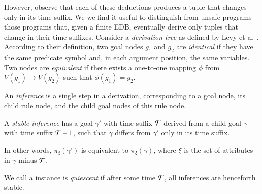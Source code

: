 However, observe that each of these deductions produces a tuple that changes
only in its time suffix.  We we find it useful to distinguish from unsafe
programs those programs that, given a finite EDB, eventually derive only tuples
that change in their time suffixes.  
Consider a \emph{derivation tree} as defined by Levy et al~\cite{levy}.  
According to their definition,
two goal nodes $g_1$ and $g_2$ are \emph{identical} if they have the same predicate symbol and, in each argument
position, the same variables.  Two nodes are \emph{equivalent} if there exists a one-to-one mapping
$\phi$ from $V(g_1) \to V(g_2)$ such that $\phi(g_1) = g_2$.



\begin{definition}


An \emph{inference} is a single step in a derivation, corresponding to a goal node, its child rule node, and the child goal
nodes of this rule node.  
\end{definition}

\begin{definition}
%
A \emph{stable inference} has a goal $\gamma'$ with time suffix $\mathcal{T}$ derived
from a child goal $\gamma$ with time suffix $\mathcal{T}-1$, such that $\gamma$ differs from
$\gamma'$ only in its time suffix.
%
\end{definition}

In other words, $\pi_\xi(\gamma')$ is equivalent to $\pi_\xi(\gamma)$, where $\xi$ is the set of attributes in $\gamma$
minus $\mathcal{T}$.



We call a \slang instance is \emph{quiescent} if after some time $\mathcal{T}$, all
inferences are henceforth  stable.

